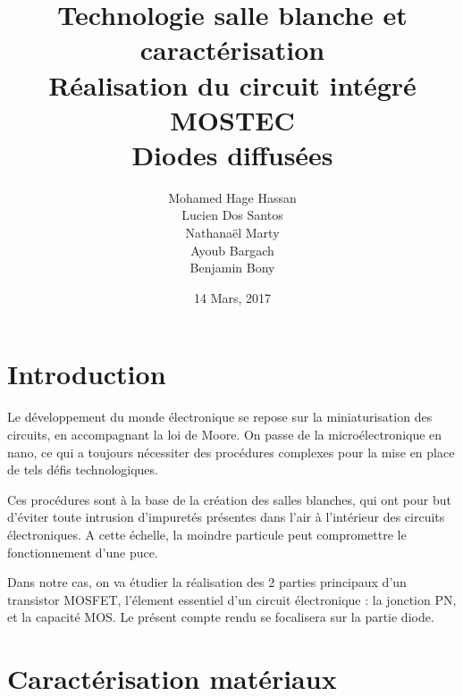 \documentclass[11pt]{article}
\begin{document}
\title{\textbf{Technologie salle blanche et caract\'erisation}\\ R\'ealisation du circuit int\'egr\'e MOSTEC \\ Diodes diffus\'ees}
\author{Mohamed Hage Hassan \\ Lucien Dos Santos \\ Nathana\"el Marty \\ Ayoub Bargach \\ Benjamin Bony}
\date{14 Mars, 2017}
\maketitle

\tableofcontents
\clearpage

\section{Introduction}
Le d\'eveloppement du monde \'electronique se repose sur la miniaturisation des circuits, en accompagnant la loi de Moore. On passe de la micro\'electronique en nano, ce qui a toujours n\'ecessiter des proc\'edures complexes pour la mise en place de tels d\'efis technologiques. 

Ces proc\'edures sont \`a la base de la cr\'eation des salles blanches, qui ont pour but d'\'eviter toute intrusion d'impuret\'es pr\'esentes dans l'air \`a l'int\'erieur des circuits \'electroniques. A cette \'echelle, la moindre particule peut compromettre le fonctionnement d'une puce.

Dans notre cas, on va \'etudier la r\'ealisation des 2 parties principaux d'un transistor MOSFET, l'\'element essentiel d'un circuit \'electronique : la jonction PN, et la capacit\'e MOS. Le pr\'esent compte rendu se focalisera sur la partie diode.


\section{Caract\'erisation mat\'eriaux}
\end{document}
